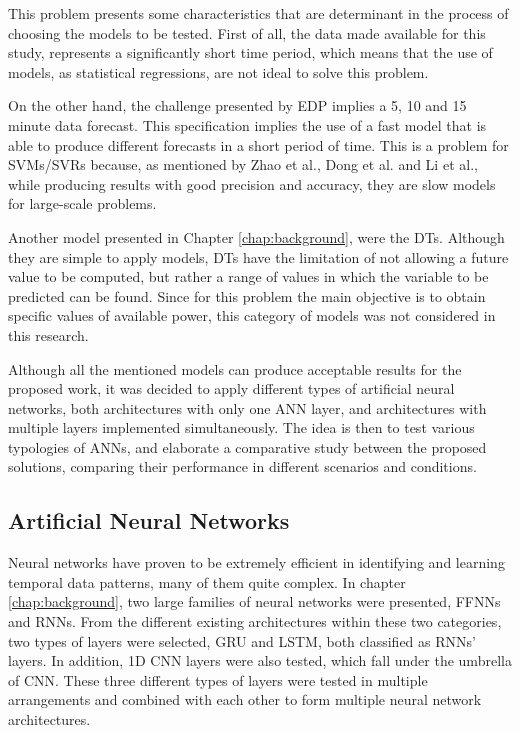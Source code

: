 This problem presents some characteristics that are determinant in the process of choosing the models to be tested. First of all, the data made available for this study, represents a significantly short time period, which means that the use of models, as statistical regressions, are not ideal to solve this problem. 

On the other hand, the challenge presented by \ac{EDP} implies a 5, 10 and 15 minute data forecast. This specification implies the use of a fast model that is able to produce different forecasts in a short period of time. This is a problem for \ac{SVM}s/\ac{SVR}s because, as mentioned by Zhao et al.\cite{svm3}, Dong et al.\cite{svm2} and Li et al.\cite{svm5}, while producing results with good precision and accuracy, they are slow models for large-scale problems. 

Another model presented in Chapter \ref{chap:background}, were the \ac{DT}s. Although they are simple to apply models, \ac{DT}s have the limitation of not allowing a future value to be computed, but rather a range of values in which the variable to be predicted can be found. Since for this problem the main objective is to obtain specific values of available power, this category of models was not considered in this research.

Although all the mentioned models can produce acceptable results for the proposed work, it was decided to apply different types of artificial neural networks, both architectures with only one \ac{ANN} layer, and architectures with multiple layers implemented simultaneously. The idea is then to test various typologies of \ac{ANN}s, and elaborate a comparative study between the proposed solutions, comparing their performance in different scenarios and conditions.

\subsection{Artificial Neural Networks}\label{chap3:subsec:artificial_neural_networks}

Neural networks have proven to be 
extremely efficient in identifying and learning temporal data patterns, many of them quite complex. In chapter \ref{chap:background}, two large families of neural networks were presented, \ac{FFNN}s and \ac{RNN}s. From the different existing architectures within these two categories, two types of layers were selected, \ac{GRU} and \ac{LSTM}, both classified as \ac{RNN}s' layers. In addition, \ac{1D CNN} layers were also tested, which fall under the umbrella of \ac{CNN}. These three different types of layers were tested in multiple arrangements and combined with each other to form multiple neural network architectures.

